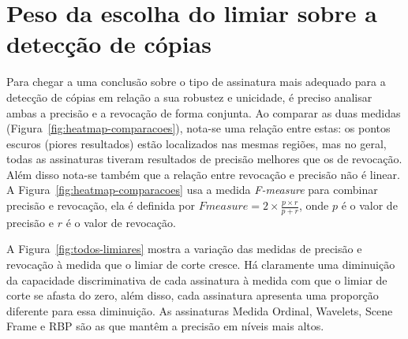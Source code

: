 \section{Peso da escolha do limiar sobre a detecção de cópias}
\label{sec:limiar}

Para chegar a uma conclusão sobre o tipo de assinatura mais adequado para a detecção de cópias em relação a sua robustez e unicidade, é preciso analisar ambas a precisão e a revocação de forma conjunta. Ao comparar as duas medidas (Figura~\ref{fig:heatmap-comparacoes}), nota-se uma relação entre estas: os pontos escuros (piores resultados) estão localizados nas mesmas regiões, mas no geral, todas as assinaturas tiveram resultados de precisão melhores que os de revocação. Além disso nota-se também que a relação entre revocação e precisão não é linear. A Figura~\ref{fig:heatmap-comparacoes} usa a medida \textit{F-measure} para combinar precisão e revocação, ela é definida por $Fmeasure = 2 \times \frac{p \times r}{p + r}$, onde $p$ é o valor de precisão e $r$ é o valor de revocação.


A Figura~\ref{fig:todos-limiares} mostra a variação das medidas de precisão e revocação à medida que o limiar de corte cresce. Há claramente uma diminuição da capacidade discriminativa de cada assinatura à medida com que o limiar de corte se afasta do zero, além disso, cada assinatura apresenta uma proporção diferente para essa diminuição. As assinaturas Medida Ordinal, Wavelets, Scene Frame e RBP são as que mantêm a precisão em níveis mais altos. 



